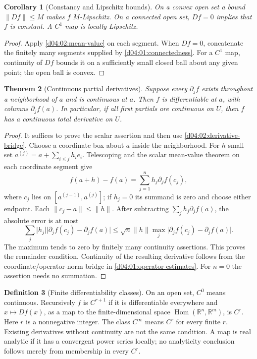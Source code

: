\documentclass[11pt,oneside,openany]{book}
\newtheorem{theorem}{Theorem}[chapter]
\newtheorem{corollary}[theorem]{Corollary}
\theoremstyle{definition}
\newtheorem{definition}[theorem]{Definition}
\theoremstyle{remark}
\newcommand{\R}{\mathbb R}
\newcommand{\abs}[1]{\lvert#1\rvert}
\newcommand{\norm}[1]{\lVert#1\rVert}
\DeclareMathOperator{\Hom}{Hom}
\begin{document}
\begin{corollary}[Constancy and Lipschitz bounds]\label{d04:02:zero-derivative}
On a convex open set a bound $\norm{Df}\leq M$ makes $f$ $M$-Lipschitz.
On a connected open set, $Df=0$ implies that $f$ is constant. A $C^1$ map
is locally Lipschitz.
\end{corollary}
\begin{proof}
Apply \cref{d04:02:mean-value} on each segment. When $Df=0$, concatenate
the finitely many segments supplied by \cref{d04:01:connectedness}.
For a $C^1$ map, continuity of $Df$ bounds it on a sufficiently small closed
ball about any given point; the open ball is convex.
\end{proof}

\begin{theorem}[Continuous partial derivatives]\label{d04:02:continuous-partials}
Suppose every $\partial_jf$ exists throughout a neighborhood of $a$ and is
continuous at $a$. Then $f$ is differentiable at $a$, with columns
$\partial_jf(a)$. In particular, if all first partials are continuous on
$U$, then $f$ has a continuous total derivative on $U$.
\end{theorem}
\begin{proof}
It suffices to prove the scalar assertion and then use
\cref{d04:02:derivative-bridge}. Choose a coordinate box about $a$ inside
the neighborhood. For $h$ small set
$a^{(j)}=a+\sum_{i\leq j}h_ie_i$. Telescoping and the scalar mean-value
theorem on each coordinate segment give
\[
 f(a+h)-f(a)=\sum_{j=1}^nh_j\partial_jf(c_j),
\]
where $c_j$ lies on $[a^{(j-1)},a^{(j)}]$; if $h_j=0$ its summand is
zero and choose either endpoint. Each $\norm{c_j-a}\leq\norm{h}$.
After subtracting $\sum_jh_j\partial_jf(a)$, the absolute error is at most
\[
 \sum_j\abs{h_j}\abs{\partial_jf(c_j)-\partial_jf(a)}
 \leq\sqrt n\norm{h}\max_j\abs{\partial_jf(c_j)-\partial_jf(a)}.
\]
The maximum tends to zero by finitely many continuity assertions. This proves
the remainder condition. Continuity of the resulting derivative follows from
the coordinate/operator-norm bridge in \cref{d04:01:operator-estimates}.
For $n=0$ the assertion needs no summation.
\end{proof}

\begin{definition}[Finite differentiability classes]\label{d04:02:cr}
On an open set, $C^0$ means continuous. Recursively $f$ is $C^{r+1}$ if
it is differentiable everywhere and $x\mapsto Df(x)$, as a map to the
finite-dimensional space $\Hom(\R^n,\R^m)$, is $C^r$.
Here $r$ is a nonnegative integer. The class $C^\infty$ means $C^r$ for
every finite $r$. Existing derivatives without continuity are not the same
condition. A map is real analytic if it has a convergent power series locally;
no analyticity conclusion follows merely from membership in every $C^r$.
\end{definition}
\end{document}
